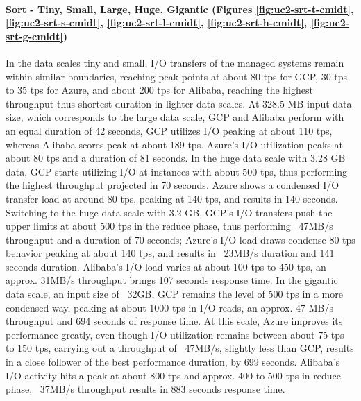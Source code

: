 \documentclass[review]{elsarticle}
\begin{document}
\paragraph{Sort - Tiny, Small, Large, Huge, Gigantic (Figures \ref{fig:uc2-srt-t-cmidt}, \ref{fig:uc2-srt-s-cmidt}, \ref{fig:uc2-srt-l-cmidt}, \ref{fig:uc2-srt-h-cmidt}, \ref{fig:uc2-srt-g-cmidt})} In the data scales tiny and small, I/O transfers of the managed systems remain within similar boundaries, reaching peak points at about 80 tps for GCP, 30 tps to 35 tps for Azure, and about 200 tps for Alibaba, reaching the highest throughput thus shortest duration in lighter data scales. At 328.5 MB input data size, which corresponds to the large data scale, GCP and Alibaba perform with an equal duration of 42 seconds, GCP utilizes I/O peaking at about 110 tps, whereas Alibaba scores peak at about 189 tps. Azure's I/O utilization peaks at about 80 tps and a duration of 81 seconds. In the huge data scale with 3.28 GB data, GCP starts utilizing I/O at instances with about 500 tps, thus performing the highest throughput projected in 70 seconds. Azure shows a condensed I/O transfer load at around 80 tps, peaking at 140 tps, and results in 140 seconds. Switching to the huge data scale with 3.2 GB, GCP's I/O transfers push the upper limits at about 500 tps in the reduce phase, thus performing ~47MB/s throughput and a duration of 70 seconds; Azure's I/O load draws condense 80 tps behavior peaking at about 140 tps, and results in ~23MB/s duration and 141 seconds duration. Alibaba's I/O load varies at about 100 tps to 450 tps, an approx. 31MB/s throughput brings 107 seconds response time. In the gigantic data scale, an input size of ~32GB, GCP remains the level of 500 tps in a more condensed way, peaking at about 1000 tps in I/O-reads, an approx. 47 MB/s throughput and 694 seconds of response time. At this scale, Azure improves its performance greatly, even though I/O utilization remains between about 75 tps to 150 tps, carrying out a throughput of ~47MB/s, slightly less than GCP, results in a close follower of the best performance duration, by 699 seconds. Alibaba's I/O activity hits a peak at about 800 tps and approx. 400 to 500 tps in reduce phase, ~37MB/s throughput results in 883 seconds response time.
\end{document}
